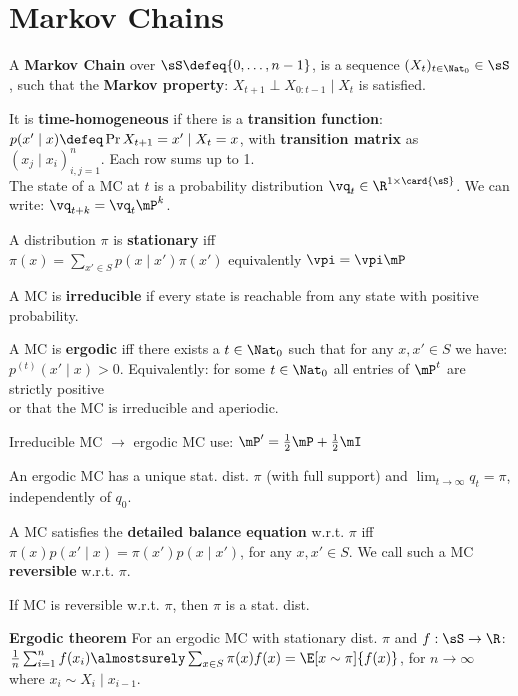\section{Markov Chains}
\begin{framed}
    A \textbf{Markov Chain} over $\sS \defeq \{0, \dots, n-1\}$, is a sequence $(X_t)_{t \in \Nat_0} \in \sS$, such that the \textbf{Markov property}: $X_{t+1} \perp X_{0:t-1} \mid X_t$ is satisfied. 
\end{framed}
It is \textbf{time-homogeneous} if there is a \textbf{transition function}: $p(x' \mid x) \defeq \Pr{X_{t+1} = x' \mid X_t = x}$, with \textbf{transition matrix} as $\left(x_j \mid x_i \right)_{i, j = 1}^n$. Each row sums up to 1. \\
The state of a MC at $t$ is a probability distribution $\vq_t \in \R^{1 \times \card{\sS}}$. We can write: $\vq_{t+k} = \vq_t \mP^k$.
\begin{framed}
    A distribution $\pi$ is \textbf{stationary} iff\\ $\pi(x) = \sum_{x' \in S} p(x \mid x') \pi(x')$ equivalently $\vpi = \vpi \mP$
\end{framed}
A MC is \textbf{irreducible} if every state is reachable from any state with positive probability.
\begin{framed}
    A MC is \textbf{ergodic} iff there exists a $t \in \Nat_0$ such that for any $x, x' \in S$ we have: $p^{(t)}(x' \mid x) > 0$. Equivalently:
    for some $t \in \Nat_0$ all entries of $\mP^t$ are strictly positive \\
    or that the MC is irreducible and aperiodic.
\end{framed}
Irreducible MC $\rightarrow$ ergodic MC use: $\mP' = \frac{1}{2}\mP + \frac{1}{2}\mI$
\begin{framed}
    An ergodic MC has a unique stat. dist. $\pi$ (with full support) and $\lim_{t\to\infty} q_t = \pi$, independently of $q_0$.
\end{framed}
\begin{framed}
    A MC satisfies the \textbf{detailed balance equation} w.r.t. $\pi$ iff $\pi(x) p(x' \mid x) = \pi(x') p(x \mid x')$, for any $x, x' \in S$. We call such a MC \textbf{reversible} w.r.t. $\pi$.
\end{framed}
If MC is reversible w.r.t. $\pi$, then $\pi$ is a stat. dist.
\begin{framed}
    \textbf{Ergodic theorem} For an ergodic MC with stationary dist. $\pi$ and $f : \sS \to \R$: \\
    $\frac{1}{n} \sum_{i=1}^n f(x_i) \almostsurely \sum_{x \in S} \pi(x) f(x) = \E[x \sim \pi]{f(x)}$, for $n\to\infty$ where $x_i \sim X_i \mid x_{i-1}$.
\end{framed}
